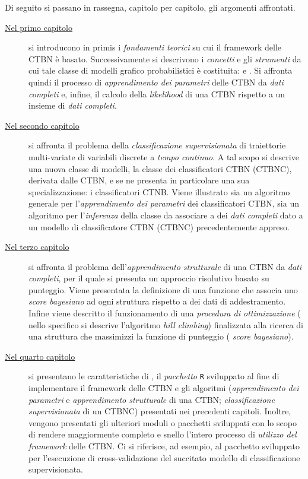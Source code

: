 Di seguito si passano in rassegna, capitolo per capitolo, gli argomenti affrontati.
\begin{description}
	\item[{\hyperref[cap:ctbn]{Nel primo capitolo}}]
	si introducono in primis i \emph{fondamenti teorici} su cui il framework delle \acf{CTBN} è basato. Successivamente si descrivono i \emph{concetti} e gli \emph{strumenti} da cui tale classe di modelli grafico probabilistici è costituita: \emph{\cim{}} e \emph{\stats{}}. Si affronta quindi il processo di \emph{apprendimento dei parametri} delle \acs{CTBN} da \emph{dati completi} e, infine, il calcolo della \emph{likelihood} di una \acs{CTBN} rispetto a un insieme di \emph{dati completi}.
	\item[{\hyperref[cap:ctbnc]{Nel secondo capitolo}}]
	si affronta il problema della \emph{classificazione supervisionata} di traiettorie multi-variate di variabili discrete a \emph{tempo continuo}. A tal scopo si descrive una nuova classe di modelli, la classe dei classificatori \acl{CTBN} (\acs{CTBNC}), derivata dalle \acs{CTBN}, e se ne presenta in particolare una sua specializzazione: i classificatori \acs{CTNB}. Viene illustrato sia un algoritmo generale per l'\emph{apprendimento dei parametri} dei classificatori \acs{CTBN}, sia un algoritmo per l'\emph{inferenza} della classe da associare a dei \emph{dati completi} dato a un modello di classificatore \acs{CTBN} (\acs{CTBNC}) precedentemente appreso.
	\item[{\hyperref[cap:structurallearning]{Nel terzo capitolo}}]
	si affronta il problema dell'\emph{apprendimento strutturale} di una \acs{CTBN} da \emph{dati completi}, per il quale si presenta un approccio risolutivo basato su punteggio. Viene presentata la definizione di una funzione che associa uno \emph{score bayesiano} ad ogni struttura rispetto a dei dati di addestramento. Infine viene descritto il funzionamento di una \emph{procedura di ottimizzazione} (\ie{} nello specifico si descrive l'algoritmo \emph{hill climbing}) finalizzata alla ricerca di una struttura che massimizzi la funzione di punteggio (\ie{} \emph{score bayesiano}).
	\item[{\hyperref[cap:ctbnr]{Nel quarto capitolo}}]
	si presentano le caratteristiche di \rctbn{}, il \emph{pacchetto} \lstinline[]|R| sviluppato al fine di implementare il framework delle \acs{CTBN} e gli algoritmi (\emph{apprendimento dei parametri} e \emph{apprendimento strutturale} di una \acs{CTBN}; \emph{classificazione supervisionata} di un \acs{CTBNC}) presentati nei precedenti capitoli. Inoltre, vengono presentati gli ulteriori moduli o pacchetti sviluppati con lo scopo di rendere maggiormente completo e snello l'intero processo di \emph{utilizzo del framework} delle \acs{CTBN}. Ci si riferisce, ad esempio, al pacchetto sviluppato per l'esecuzione di cross-validazione del succitato modello di classificazione supervisionata.

\end{description}
